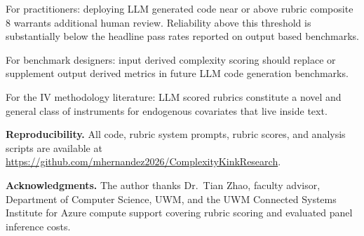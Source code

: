 \documentclass[conference]{IEEEtran}
\begin{document}
For practitioners: deploying LLM generated code near or above rubric composite 8 warrants additional human review. Reliability above this threshold is substantially below the headline pass rates reported on output based benchmarks.

For benchmark designers: input derived complexity scoring should replace or supplement output derived metrics in future LLM code generation benchmarks.

For the IV methodology literature: LLM scored rubrics constitute a novel and general class of instruments for endogenous covariates that live inside text.

\vspace{4pt}
\noindent\textbf{Reproducibility.} All code, rubric system prompts, rubric scores, and analysis scripts are available at \url{https://github.com/mhernandez2026/ComplexityKinkResearch}.

\noindent\textbf{Acknowledgments.} The author thanks Dr.\ Tian Zhao, faculty advisor, Department of Computer Science, UWM, and the UWM Connected Systems Institute for Azure compute support covering rubric scoring and evaluated panel inference costs.
\end{document}
